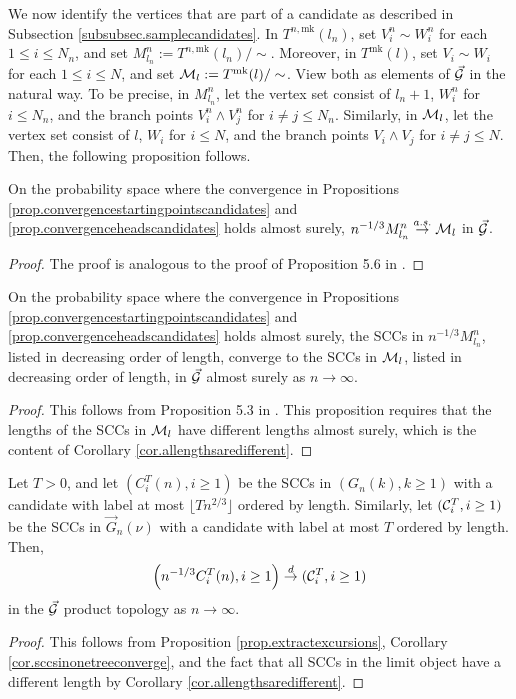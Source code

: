 We now identify the vertices that are part of a candidate as described in Subsection \ref{subsubsec.samplecandidates}. In $T^{n,\text{mk}}(l_n)$, set $V_i^n\sim W_i^n$ for each $1\leq i\leq N_n$, and set $M^n_{l_n}:=T^{n,\text{mk}}(l_n)/\sim$. Moreover, in $T^{\text{mk}}(l)$, set $V_i\sim W_i$ for each $1\leq i\leq N$, and set ${\mathcal M}_l:=T^{\text{mk}}(l)/\sim$. View both as elements of $\vec{{\mathcal G}}$ in the natural way. To be precise, in  $M^n_{l_n}$, let the vertex set consist of $l_n+1$, $W_i^n$ for $i\leq N_n$, and the branch points $V_i^n\wedge V_j^n$ for $i\neq j\leq N_n$. Similarly, in ${\mathcal M}_l$, let the vertex set consist of $l$, $W_i$ for $i\leq N$, and the branch points $V_i\wedge V_j$ for $i\neq j\leq N$. Then, the following proposition follows.
\begin{proposition}
On the probability space where the convergence in Propositions \ref{prop.convergencestartingpointscandidates} and \ref{prop.convergenceheadscandidates} holds almost surely, 
$n^{-1/3}M^n_{l_n}\overset{a.s.}{\to} {\mathcal M}_l$
in $\vec{{\mathcal G}}$.
\end{proposition}
\begin{proof}
The proof is analogous to the proof of Proposition 5.6 in \cite{goldschmidtScalingLimitCritical2019}.
\end{proof}
\begin{corollary}\label{cor.sccsinonetreeconverge}
On the probability space where the convergence in Propositions \ref{prop.convergencestartingpointscandidates} and \ref{prop.convergenceheadscandidates} holds almost surely, the SCCs in $n^{-1/3}M^n_{l_n}$, listed in decreasing order of length, converge to the SCCs in ${\mathcal M}_l$, listed in decreasing order of length, in $\vec{{\mathcal G}}$ almost surely as $n\to \infty$.
\end{corollary}
\begin{proof}
This follows from Proposition 5.3 in \cite{goldschmidtScalingLimitCritical2019}. This proposition requires that the lengths of the SCCs in ${\mathcal M}_{l}$ have different lengths almost surely, which is the content of Corollary \ref{cor.allengthsaredifferent}. 
\end{proof}

\begin{corollary}\label{cor.sccordereduptotimeT}
Let $T>0$, and let $(C^T_i(n),i\geq 1)$ be the SCCs in $(G_n(k),k\geq 1)$ with a candidate with label at most $\lfloor T n^{2/3}\rfloor$ ordered by length. Similarly, let $({\mathcal C}^T_i,i\geq 1)$ be the SCCs in $\vec{G}_n(\nu)$ with a candidate with label at most $T$ ordered by length. Then,
$$\left(n^{-1/3}C^T_i(n), i\geq 1\right) \overset{d}{\to} ({\mathcal C}^T_i,i\geq 1)$$
in the $\vec{{\mathcal G}}$ product topology as $n\to \infty$. 
\end{corollary}
\begin{proof}
This follows from Proposition \ref{prop.extractexcursions}, Corollary \ref{cor.sccsinonetreeconverge}, and the fact that all SCCs in the limit object have a different length by Corollary \ref{cor.allengthsaredifferent}. 
\end{proof}

